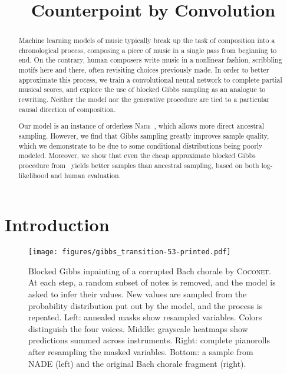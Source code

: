 \documentclass{article}
\title{Counterpoint by Convolution}
\newcommand{\coconet}{\textsc{Coconet}\xspace}
\newcommand{\nade}{\textsc{Nade}\xspace}
\begin{document}
\maketitle
\begin{abstract}
Machine learning models of music typically break up the task of composition into a chronological process, composing a piece of music in a single pass from beginning to end.
On the contrary, human composers write music in a nonlinear fashion, scribbling motifs here and there, often revisiting choices previously made.
In order to better approximate this process, we train a convolutional neural network to complete partial musical scores, and explore the use of blocked Gibbs sampling as an analogue to rewriting.
Neither the model nor the generative procedure are tied to a particular causal direction of composition.

Our model is an instance of orderless \nade~\cite{uria2014deep}, which allows more direct ancestral sampling.
However, we find that Gibbs sampling greatly improves sample quality, which we demonstrate to be due to some conditional distributions being poorly modeled.
Moreover, we show that even the cheap approximate blocked Gibbs procedure from~\cite{yao2014equivalence} yields better samples than ancestral sampling, based on both log-likelihood and human evaluation.
\end{abstract}

\section{Introduction}\label{sec:introduction}

\begin{figure}[h!]
\begin{center}
\texttt{[image: figures/gibbs\_transition-53-printed.pdf]}
\end{center}
\caption{
Blocked Gibbs inpainting of a corrupted Bach chorale by \coconet.
At each step, a random subset of notes is removed, and the model is asked to infer their values.
New values are sampled from the probability distribution put out by the model, and the process is repeated.
Left: annealed masks show resampled variables. Colors distinguish the four voices.
Middle: grayscale heatmaps show predictions  summed across instruments.
Right: complete pianorolls after resampling the masked variables. 
Bottom: a sample from NADE (left) and the original Bach chorale fragment (right).
}
\label{fig:process}
\end{figure}
\end{document}
